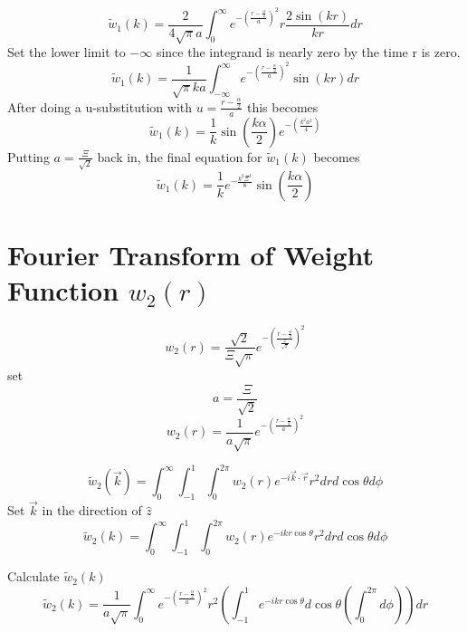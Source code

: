 \documentclass[double,12pt]{beavtex}
\begin{document}
\begin{equation}{\widetilde{w}_1(k)=\frac{2}{4\sqrt{\pi}a}\int_{0}^{\infty}e^{-\left(\frac{r-\frac{\alpha}{2}}{a}\right)^2}r\frac{2\sin(kr)}{kr}d{r}}\end{equation}
Set the lower limit to $-\infty$ since the integrand is nearly zero by the time r is zero. 
\begin{equation}{\widetilde{w}_1(k)=\frac{1}{\sqrt{\pi}ka}\int_{-\infty}^{\infty}e^{-\left(\frac{r-\frac{\alpha}{2}}{a}\right)^2}\sin(kr)d{r}}\end{equation}
After doing a u-substitution with $u=\frac{r-\frac{\alpha}{2}}{a}$ this becomes
\begin{equation}{\widetilde{w}_1(k)=\frac{1}{k}\sin\left(\frac{k\alpha}{2}\right)e^{-\left(\frac{k^2a^2}{4}\right)}}\end{equation}
Putting $a=\frac{\Xi}{\sqrt{2}}$ back in, the final equation for $\widetilde{w}_1(k)$ becomes
\begin{equation}
    \widetilde{w}_1(k)=\frac{1}{k}e^{-\frac{k^2\Xi^2}{8}}\sin\left(\frac{k\alpha}{2}\right)
\end{equation}

\section{Fourier Transform of Weight Function $w_{2}(r)$}
\begin{equation}{w_2(r)=\frac{\sqrt{2}}{\Xi\sqrt{\pi}}e^{-\left(\frac{r-\frac{\alpha}{2}}{\frac{\Xi}{\sqrt{2}}}\right)^2}}\end{equation}
set 
\begin{equation}{a=\frac{\Xi}{\sqrt{2}}}\end{equation}
\begin{equation}{w_2(r)=\frac{1}{a\sqrt{\pi}}e^{-\left(\frac{r-\frac{\alpha}{2}}{a}\right)^2}}\end{equation}

\begin{equation}{\widetilde{w}_2(\vec{k})=\int_{0}^{\infty}\int_{-1}^{1}\int_{0}^{2\pi}w_2(r)e^{-i\vec{k}\cdot{\vec{r}}}r^2d{r}d{\cos\theta}d{\phi}}\end{equation}
Set $\vec{k}$ in the direction of $\hat{z}$ 
\begin{equation}{\widetilde{w}_2(k)=\int_{0}^{\infty}\int_{-1}^{1}\int_{0}^{2\pi}w_2(r)e^{-ikr\cos\theta}r^2d{r}d{\cos\theta}d{\phi}}\end{equation}

\noindent Calculate $\widetilde{w}_2(k)$ 
\begin{equation}{\widetilde{w}_2(k)=\frac{1}{a\sqrt{\pi}}\int_{0}^{\infty}e^{-\left(\frac{r-\frac{\alpha}{2}}{a}\right)^2}r^2\left(\int_{-1}^{1}e^{-ikr\cos\theta}d{\cos\theta}\left(\int_{0}^{2\pi}d{\phi}\right)\right)d{r}}\end{equation}
\end{document}
